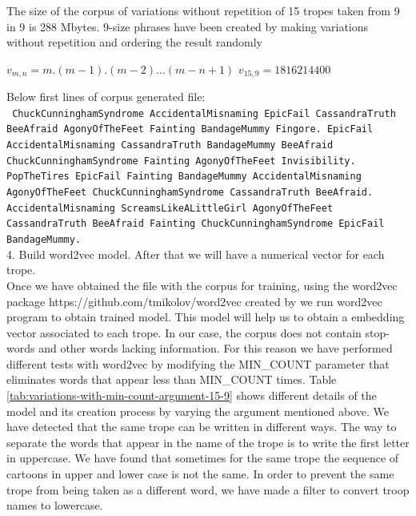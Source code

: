 \documentclass[letterpaper]{article}
\begin{document}
	The size of the corpus of variations without repetition of 15 tropes taken from 9 in 9 is 288 Mbytes. 9-size phrases have been created by making variations without repetition and ordering the result randomly \\
	
	\begin{center}
		
		${v}_{m,n} = m.(m-1).(m-2)...(m-n+1)$
		${v}_{15,9} = 1816214400$
		
	\end{center}
	
	Below first lines of corpus generated file:\\
	\texttt{    
		ChuckCunninghamSyndrome AccidentalMisnaming EpicFail CassandraTruth BeeAfraid AgonyOfTheFeet Fainting BandageMummy Fingore. EpicFail AccidentalMisnaming CassandraTruth BandageMummy BeeAfraid ChuckCunninghamSyndrome Fainting AgonyOfTheFeet Invisibility. PopTheTires EpicFail Fainting BandageMummy AccidentalMisnaming AgonyOfTheFeet ChuckCunninghamSyndrome CassandraTruth BeeAfraid. AccidentalMisnaming ScreamsLikeALittleGirl AgonyOfTheFeet CassandraTruth BeeAfraid Fainting ChuckCunninghamSyndrome EpicFail BandageMummy.}\\
	
	
	
	
	4. Build word2vec model. After that we will have a numerical vector for each trope. \\
	   
	   Once we have obtained the file with the corpus for training, using the word2vec package https://github.com/tmikolov/word2vec created by
	   \cite{mikolov2013} we run word2vec program to obtain trained model. This model will help us to obtain a embedding vector associated to each trope.
	   In our case, the corpus does not contain stop-words and other words lacking information. For this reason we have performed different tests with
	   word2vec by modifying the MIN\_COUNT parameter that eliminates words that appear less than MIN\_COUNT times. Table \ref{tab:variations-with-min-count-argument-15-9}
	   shows different details of the model and its creation process by varying the argument mentioned above.
	   We have detected that the same trope can be written in different ways. The way to separate the words that appear in the name of the trope is to write
	    the first letter in uppercase. We have found that sometimes for the same trope the sequence of cartoons in upper and lower case is not the same. 
	   In order to prevent the same trope from being taken as a different word, we have made a filter to convert troop names to lowercase.
	   
\end{document}
